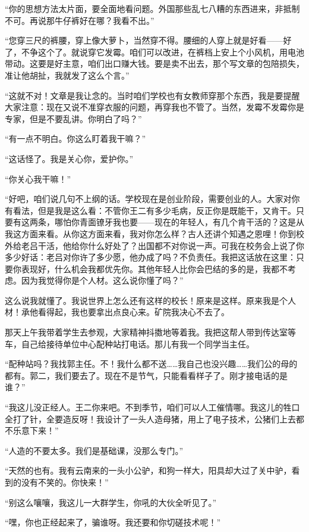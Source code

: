 “你的思想方法太片面，要全面地看问题。外国那些乱七八糟的东西进来，非抵制不可。再说那牛仔裤好在哪？我看不出。” 
 
 “您穿三尺的裤腰，穿上像大萝卜，当然穿不得。腰细的人穿上就是好看——好了，不争这个了。就说穿它发霉。咱们可以改进，在裤档上安上个小风机，用电池带动。这要是好主意，咱们出口赚大钱。要是卖不出去，那个写文章的包陪损失，准让他胡扯，我就发了这么个言。” 
 
 “这就不对！文章是我让念的。当时咱们学校也有女教师穿那个东西，我是要提醒大家注意：现在又说不准穿衣服的问题，再穿我也不管了。当然，发霉不发霉你是专家，但是不要乱讲。你明白了吗？” 
 
 “有一点不明白。你这么盯着我干嘛？” 
 
 “这话怪了。我是关心你，爱护你。” 
 
 “你关心我干嘛！” 
 
 “好吧，咱们说几句不上纲的话。学校现在是创业阶段，需要创业的人。大家对你有看法，但是我是这么看：不管你王二有多少毛病，反正你是既能干，又肯干。只要有这两条，哪怕你青面镣牙我也要——现在的年轻人，有几个肯干活的？这是从我这方面来看。从你这方面来看，我对你怎么样？古人还讲个知遇之恩哩！你到校外给老吕干活，他给你什么好处了？出国都不对你说一声。可我在校务会上说了你多少好话：老吕对你许了多少愿，他办成了吗？不负责任。我把这话放在这里：只要你表现好，什么机会我都优先你。其他年轻人比你会巴结的多的是，我都不考虑。因为我觉得你是个人材。这么说你懂了吗？” 
 
 这么说我就懂了。我说世界上怎么还有这样的校长！原来是这样。原来我是个人材！承他看得起，我也要拿出点良心来。矿院我决心不去了。 
 
 那天上午我带着学生去参观，大家精神抖擞地等着我。我把这帮人带到传达室等车，自己给接待单位中心配种站打电话。那儿有我一个同学当主任。 
 
 “配种站吗？我找郭主任。不！我什么都不送……我自己也没兴趣……我们公的母的都有。郭二，我们要去了。现在不是节气，只能看看样子了。刚才接电话的是谁？” 
 
 “我这儿没正经人。王二你来吧。不到季节，咱们可以人工催情哪。我这儿的牲口全打了针，全要造反呀！我设计了一头人造母猪，用上了电子技术，公猪们上去都不乐意下来！” 
 
 “人造的不要太多。我们是基础课，没那么专门。” 
 
 “天然的也有。我有云南来的一头小公驴，和狗一样大，阳具却大过了关中驴，看到的没有不笑的。你快来！” 
 
 “别这么嚷嚷，我这儿一大群学生，你吼的大伙全听见了。” 
 
 “嘿，你也正经起来了，骗谁呀。我还要和你切磋技术呢！” 
 
